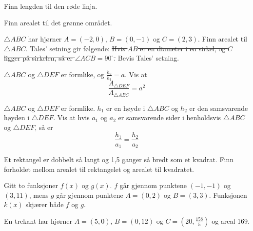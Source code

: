 Finn lengden til den røde linja.

Finn arealet til det grønne området.

$\triangle ABC$ har hjørner $A=(-2, 0)$, $B=(0, -1)$ og $C=(2, 3)$. Finn arealet til $\triangle ABC$.
\newpage
{}
Tales' setning gir følgende:
\st{
	Hvis $AB$ er en diameter i en sirkel, og $C$ ligger på sirkelen, så er $\angle ACB=90^\circ$.
}
Bevis Tales' setning.


$ \triangle ABC $ og $ \triangle DEF $ er formlike, og $\frac{h_2}{h_1}=a$. Vis at
\[ \frac{A_{\triangle DEF}}{A_{\triangle ABC}}=a^2 \]

$ \triangle ABC $ og $ \triangle DEF $ er formlike. $h_1$ er en høyde i $\triangle ABC$ og $h_2$ er den samsvarende høyden i $\triangle DEF$. Vis at hvis $a_1$ og $a_2$ er samsvarende sider i henholdsvis $\triangle ABC$ og $\triangle DEF$, så er
\[ \frac{h_1}{a_1}=\frac{h_2}{a_2} \]

Et rektangel er dobbelt så langt og 1,5 ganger så bredt som et kvadrat. Finn forholdet mellom arealet til rektangelet og arealet til kvadratet.

\newpage

Gitt to funksjoner $f(x)$ og $g(x)$. $f$ går gjennom punktene $(-1, -1)$ og $(3, 11)$, mens 
$g$ går gjennom punktene $A=(0, 2)$ og $B=(3, 3)$. Funksjonen $k(x)$ skjærer både $f$ og $g$.

En trekant har hjørner $A=(5, 0)$, $B=(0, 12)$ og $C=\left(20, \frac{158}{5}\right)$ og areal 169.


